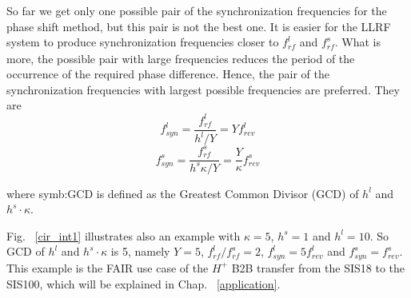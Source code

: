 So far we get only one possible pair of the synchronization frequencies for the phase shift method, but this pair is not the best one. It is easier for the LLRF system to produce synchronization frequencies closer to $f_{\mathit{rf}}^{l}$ and $f_{\mathit{rf}}^{s}$. What is more, the possible pair with large frequencies reduces the period of the occurrence of the required phase difference. Hence, the pair of the synchronization frequencies with largest possible frequencies are preferred. They are
\begin{equation}
f_{\mathit{syn}}^{l}=\frac{f_{\mathit{rf}}^{l}}{h^{l}/Y}=Yf_{\mathit{rev}}^{l} \label{synch_freq1}
\end{equation}
\begin{equation}
f_{\mathit{syn}}^{s}=\frac{f_{\mathit{rf}}^{s}}{h^{s}\kappa/Y}=\frac{Y}{\kappa}f_{\mathit{rev}}^{s} \label{synch_freq2}
\end{equation}

where \gls{symb:GCD} is defined as the Greatest Common Divisor (\gls{GCD}) of $h^l$ and $h^s \cdot \kappa$.


Fig. ~\ref{cir_int1} illustrates also an example with $\kappa=5$, $h^s=1$ and $h^l=10$. So GCD of $h^l$ and $h^s \cdot \kappa$ is 5, namely $Y=5$, $f_{\mathit{rf}}^{l}/f_{\mathit{rf}}^{s}=2$, $f_{\mathit{syn}}^{l}=5f_{\mathit{rev}}^{l}$ and $f_{\mathit{syn}}^{s}=f_{\mathit{rev}}^{s}$. This example is the FAIR use case of the $H^{+}$ B2B transfer from the SIS18 to the SIS100, which will be explained in Chap. ~\ref{application}.


